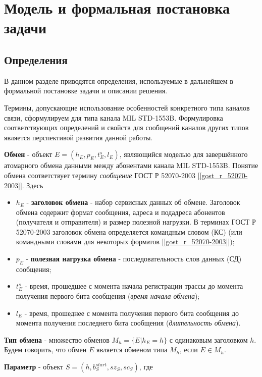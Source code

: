\section{Модель и формальная постановка задачи}

\subsection{Определения}

В данном разделе приводятся определения, используемые в дальнейшем в 
формальной постановке задачи и описании решения.

Термины, допускающие использование особенностей конкретного типа каналов связи, 
сформулируем для типа канала MIL STD-1553B. Формулировка соответствующих 
определений и 
свойств для сообщений каналов других типов является перспективой развития 
данной работы.

\textbf{Обмен} - объект $E = (h_E, p_E, t^s_E, l_E)$, являющийся моделью для 
завершённого атомарного обмена данными между абонентами канала MIL STD-1553B. 
Понятие обмена соответствует термину \textit{сообщение} ГОСТ Р 52070-2003 
[\ref{gost_r_52070-2003}]. Здесь
\begin{itemize}
 \item $h_E$ - \textbf{заголовок обмена} - набор сервисных данных об обмене. 
 Заголовок обмена содержит формат сообщения, адреса и подадреса абонентов 
(получателя и отправителя) и размер полезной нагрузки. В терминах ГОСТ Р 
52070-2003 заголовок обмена определяется командным словом (КС) (или командными 
словами для некоторых форматов [\ref{gost_r_52070-2003}]);
 \item $p_E$ - \textbf{полезная нагрузка обмена} - последовательность слов 
данных (СД) сообщения;
 \item $t^s_E$ - время, прошедшее с момента начала регистрации трассы до 
момента получения первого бита сообщения (\textit{время начала обмена});
 \item $l_E$ - время, прошеднее с момента получения первого бита сообщения до 
момента получения последнего бита сообщения (\textit{длительность обмена}).
\end{itemize}

\textbf{Тип обмена} - множество обменов $M_h = \{E | h_E = h\}$ с 
одинаковым заголовком $h$. Будем говорить, что обмен $E$ является обменом типа 
$M_h$, если $E \in M_h$.

\textbf{Параметр} - объект $S = (h, b^{start}_S, sz_S, sc_S)$, где

